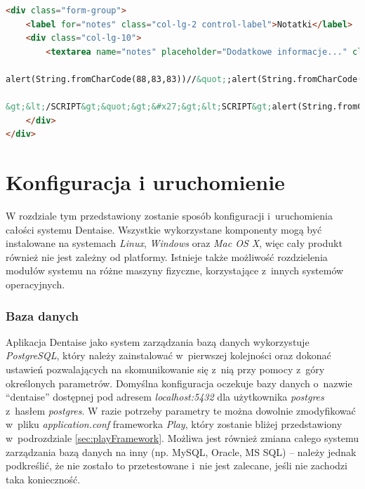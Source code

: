 \documentclass[11pt]{aghdpl}
\begin{document}
\begin{lstlisting}[language=HTML]
<div class="form-group">
    <label for="notes" class="col-lg-2 control-label">Notatki</label>
    <div class="col-lg-10">
        <textarea name="notes" placeholder="Dodatkowe informacje..." class="form-control" rows="5">&#x27;;alert(String.fromCharCode(88,83,83))//&#x27;;alert(String.fromCharCode(88,83,83))//&quot;;

alert(String.fromCharCode(88,83,83))//&quot;;alert(String.fromCharCode(88,83,83))//--

&gt;&lt;/SCRIPT&gt;&quot;&gt;&#x27;&gt;&lt;SCRIPT&gt;alert(String.fromCharCode(88,83,83))&lt;/SCRIPT&gt;</textarea>
    </div>
</div>
\end{lstlisting}


\chapter{Konfiguracja i uruchomienie}
\label{cha:konfiguracja_i_uruchomienie}

W rozdziale tym przedstawiony zostanie sposób konfiguracji i~uruchomienia całości systemu Dentaise. Wszystkie wykorzystane komponenty mogą być instalowane na systemach \emph{Linux}, \emph{Windows} oraz \emph{Mac OS X}, więc cały produkt również nie jest zależny od platformy. Istnieje także możliwość rozdzielenia modułów systemu na różne maszyny fizyczne, korzystające z~innych systemów operacyjnych.

\subsection{Baza danych}

Aplikacja Dentaise jako system zarządzania bazą danych wykorzystuje \emph{PostgreSQL}, który należy zainstalować w~pierwszej kolejności oraz dokonać ustawień pozwalających na skomunikowanie się z~nią przy pomocy z~góry określonych parametrów. Domyślna konfiguracja oczekuje bazy danych o~nazwie ``dentaise'' dostępnej pod adresem \emph{localhost:5432} dla użytkownika \emph{postgres} z~hasłem \emph{postgres}. W razie potrzeby parametry te można dowolnie zmodyfikować w~pliku \emph{application.conf} frameworka \emph{Play}, który zostanie bliżej przedstawiony w~podrozdziale \ref{sec:playFramework}. Możliwa jest również zmiana całego systemu zarządzania bazą danych na inny (np. MySQL, Oracle, MS SQL) -- należy jednak podkreślić, że nie zostało to przetestowane i~nie jest zalecane, jeśli nie zachodzi taka konieczność.
\end{document}

